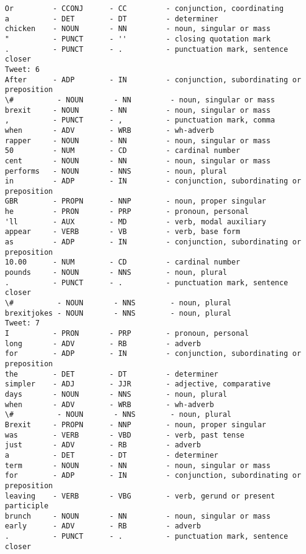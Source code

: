 \begin{Verbatim}[commandchars=\\\{\}]
Or         - CCONJ      - CC         - conjunction, coordinating
a          - DET        - DT         - determiner
chicken    - NOUN       - NN         - noun, singular or mass
"          - PUNCT      - ''         - closing quotation mark
.          - PUNCT      - .          - punctuation mark, sentence closer
Tweet: 6
After      - ADP        - IN         - conjunction, subordinating or preposition
\#          - NOUN       - NN         - noun, singular or mass
brexit     - NOUN       - NN         - noun, singular or mass
,          - PUNCT      - ,          - punctuation mark, comma
when       - ADV        - WRB        - wh-adverb
rapper     - NOUN       - NN         - noun, singular or mass
50         - NUM        - CD         - cardinal number
cent       - NOUN       - NN         - noun, singular or mass
performs   - NOUN       - NNS        - noun, plural
in         - ADP        - IN         - conjunction, subordinating or preposition
GBR        - PROPN      - NNP        - noun, proper singular
he         - PRON       - PRP        - pronoun, personal
'll        - AUX        - MD         - verb, modal auxiliary
appear     - VERB       - VB         - verb, base form
as         - ADP        - IN         - conjunction, subordinating or preposition
10.00      - NUM        - CD         - cardinal number
pounds     - NOUN       - NNS        - noun, plural
.          - PUNCT      - .          - punctuation mark, sentence closer
\#          - NOUN       - NNS        - noun, plural
brexitjokes - NOUN       - NNS        - noun, plural
Tweet: 7
I          - PRON       - PRP        - pronoun, personal
long       - ADV        - RB         - adverb
for        - ADP        - IN         - conjunction, subordinating or preposition
the        - DET        - DT         - determiner
simpler    - ADJ        - JJR        - adjective, comparative
days       - NOUN       - NNS        - noun, plural
when       - ADV        - WRB        - wh-adverb
\#          - NOUN       - NNS        - noun, plural
Brexit     - PROPN      - NNP        - noun, proper singular
was        - VERB       - VBD        - verb, past tense
just       - ADV        - RB         - adverb
a          - DET        - DT         - determiner
term       - NOUN       - NN         - noun, singular or mass
for        - ADP        - IN         - conjunction, subordinating or preposition
leaving    - VERB       - VBG        - verb, gerund or present participle
brunch     - NOUN       - NN         - noun, singular or mass
early      - ADV        - RB         - adverb
.          - PUNCT      - .          - punctuation mark, sentence closer

\end{Verbatim}
